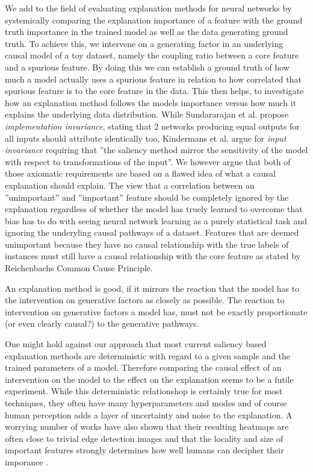 We add to the field of evaluating explanation methods for neural networks by systemically comparing the explanation importance of a feature with the ground truth importance in the trained model as well as the data generating ground truth. To achieve this, we intervene on a generating factor in an underlying causal model of a toy dataset, namely the coupling ratio between a core feature and a spurious feature. By doing this we can establish a ground truth of how much a model actually uses a spurious feature in relation to how correlated that spurious feature is to the core feature in the data. This then helps, to investigate how an explanation method follows the models importance versus how much it explains the underlying data distribution. While Sundararajan et al. \cite{Sundararajan2017} propose \textit{implementation invariance}, stating that 2 networks producing equal outputs for all inputs should attribute identically too, Kindermans et al. \cite{Kindermans2019} argue for \textit{input invariance} requiring that ''the saliency method mirror the sensitivity of the model with respect to transformations of the input''.
We however argue that both of those axiomatic requirements are based on a flawed idea of what a causal explanation should explain. 
The view that a correlation between an ''unimportant'' and ''important'' feature should be completely ignored by the explanation regardless of whether the model has truely learned to overcome that bias has to do with seeing neural network learning as a purely statistical task and ignoring the underyling causal pathways of a dataset. 
Features that are deemed unimportant because they have no causal relationship with the true labels of instances must still have a causal relationship with the core feature as stated by Reichenbachs Common Cause Principle. 

An explanation method is good, if it mirrors the reaction that the model has to the intervention on generative factors as closely as possible. The reaction to intervention on generative factors a model has, must not be exactly proportionate (or even clearly causal?) to the generative pathways.

One might hold against our approach that most current saliency based explanation methods are deterministic with regard to a given sample and the trained parameters of a model. Therefore comparing the causal effect of an intervention on the model to the effect on the explanation seems to be a futile experiment. While this deterministic relationshop is certainly true for most techniques, they often have many hyperparameters and modes and of course human perception adds a layer of uncertainty and noise to the explanation. A worrying number of works  have also shown that their resulting heatmaps are often close to trivial edge detection images  and that the locality and size of important features strongly determines how well humans can decipher their imporance .


